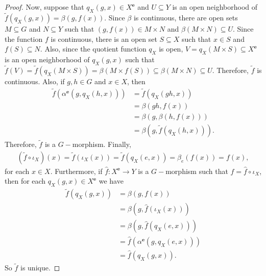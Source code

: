 \documentclass[sn-mathphys-num]{sn-jnl}%
\theoremstyle{thmstyleone}%
\theoremstyle{thmstyletwo}%
\theoremstyle{thmstylethree}%
\begin{document}
\begin{proof}
Now, suppose that $q_X(g,x)\in X^\mathbf{e}$ and $U\subseteq Y$ is an open neighborhood of $\tilde{f}(q_X(g,x))=\beta(g,f(x))$.
Since $ \beta $ is continuous, there are open sets $ M \subseteq G $ and $ N \subseteq Y $ such that $(g,f(x))\in M\times N$ and $\beta(M\times N)\subseteq U$.
Since the function $ f $ is continuous, there is an open set $ S \subseteq X $ such that $ x \in S $ and $ f (S) \subseteq N $.
Also, since the quotient function $ q_X $ is open, $V=q_X(M\times S)\subseteq X^\mathbf{e}$ is an open neighborhood of $ q_X (g, x) $ such that  $\tilde{f}(V)=\tilde{f}(q_X(M\times S))=\beta(M\times f(S))\subseteq\beta(M\times N)\subseteq U$.
Therefore, $ \tilde{f} $ is continuous.
Also, if $ g, h \in G $ and $ x \in X $, then
\begin{align*}
\tilde{f}(\alpha^\mathbf{e}(g,q_X(h,x)))
&=\tilde{f}(q_X(gh,x))\\
&=\beta(gh,f(x))\\
&=\beta(g,\beta(h,f(x)))\\
&=\beta(g,\tilde{f}(q_X(h,x))).
\end{align*}
Therefore, $ \tilde {f} $ is a $ G-$morphism. Finally,
\begin{align*}
(\tilde{f}\circ \iota_X)(x)=\tilde{f}(\iota_X(x))=\tilde{f}(q_X(e,x))=\beta_e(f(x))=f(x),
\end{align*}
for each $x\in X$.
Furthermore, if $\hat{f}:X^\mathbf{e}\to Y$ is a $ G-$morphism such that $f=\hat{f}\circ \iota_X$, then for each $q_X(g,x)\in X^\mathbf{e}$ we have
\begin{align*}
\tilde{f}(q_X(g,x))
&=\beta(g,f(x))\\
&=\beta(g,\hat{f}(\iota_X(x)))\\
& =\beta(g,\hat{f}(q_X(e,x)))\\
&=\hat{f}(\alpha^\mathbf{e}(g,q_X(e,x)))\\
&=\hat{f}(q_X(g,x)).
\end{align*}
So $\tilde{f}$ is unique.
\end{proof}
\vspace{0.2cm}
\end{document}
